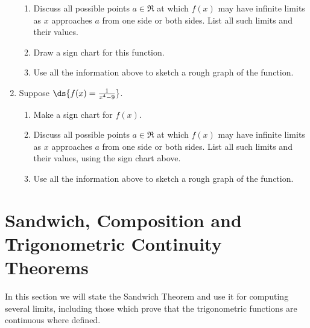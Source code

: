 \begin{multicols}{2}
\begin{enumerate}
  \begin{enumerate}
  \item Discuss all possible points $a\in\Re$ at which 
  $f(x)$ may have infinite limits as $x$ approaches
  $a$ from one side or both sides.  List all
  such limits and their values.
  \item Draw a sign chart for this function.
  \item Use all the information above to sketch a rough graph of the function.
  \end{enumerate}
\item Suppose $\ds{f(x)=\frac1{x^4-9}}$. 
  \begin{enumerate}
   \item Make a sign chart for $f(x)$.
  \item  Discuss all possible points $a\in\Re$ at which 
  $f(x)$ may have infinite limits as $x$ approaches
  $a$ from one side or both sides.  List all
  such limits and their values, using the sign chart above.
  \item Use all the information above to sketch a rough graph of the function.
  \end{enumerate}
\end{enumerate}

\end{multicols}
\newpage
\section[Sandwich, Composition, Trigonometric Continuity]{Sandwich, Composition and Trigonometric Continuity Theorems
\label{STCT}}
In this section we will state the Sandwich Theorem\footnotemark
and use it for computing several limits, including those
which prove that the trigonometric functions are continuous
where defined. 


